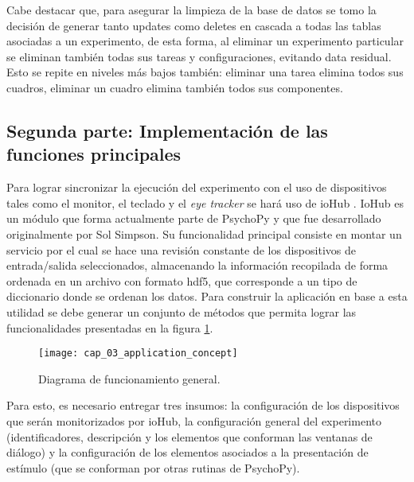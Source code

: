\documentclass[\main/main.tex]{subfiles}
\begin{document}
			Cabe destacar que, para asegurar la limpieza de la base de datos se tomo la decisión de generar tanto updates como deletes en cascada a todas las tablas asociadas a un experimento, de esta forma, al eliminar un experimento particular se eliminan también todas sus tareas y configuraciones, evitando data residual. Esto se repite en niveles más bajos también: eliminar una tarea elimina todos sus cuadros, eliminar un cuadro elimina también todos sus componentes.  

		\subsection{Segunda parte: Implementación de las funciones principales}
		\label{sub:03_implementacion_backtend}
			Para lograr sincronizar la ejecución del experimento con el uso de dispositivos tales como el monitor, el teclado y el \textit{eye tracker} se hará uso de ioHub \cite{website:iohub}. IoHub es un módulo que forma actualmente parte de PsychoPy y que fue desarrollado originalmente por Sol Simpson. Su funcionalidad principal consiste en montar un servicio por el cual se hace una revisión constante de los dispositivos de entrada/salida seleccionados, almacenando la información recopilada de forma ordenada en un archivo con formato hdf5, que corresponde a un tipo de diccionario donde se ordenan los datos. Para construir la aplicación en base a esta utilidad se debe generar un conjunto de métodos que permita lograr las funcionalidades presentadas en la figura \ref{fig:03_application_concept}. 
			\begin{figure}[H]
				\centering
				\texttt{[image: cap\_03\_application\_concept]}
				\caption{Diagrama de funcionamiento general.}
				\label{fig:03_application_concept}
			\end{figure} 

			Para esto, es necesario entregar tres insumos: la configuración de los dispositivos que serán monitorizados por ioHub, la configuración general del experimento (identificadores, descripción y los elementos que conforman las ventanas de diálogo) y la configuración de los elementos asociados a la presentación de estímulo (que se conforman por otras rutinas de PsychoPy).
\end{document}
